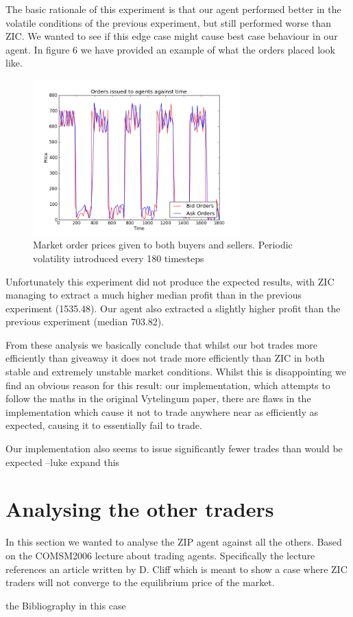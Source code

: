 \documentclass{acm_proc_article-sp}
\begin{document}
The basic rationale of this experiment is that our agent performed better in
the volatile conditions of the previous experiment, but still performed worse
than ZIC. We wanted to see if this edge case might cause best case behaviour in
our agent. In figure 6 we have provided an example of what the orders placed look
like.

\begin{figure}[h!] \includegraphics[width=80mm]{squarewave.png} \caption{Market
order prices given to both buyers and sellers. Periodic volatility introduced
every 180 timesteps} \end{figure}

Unfortunately this experiment did not produce the expected results, with ZIC
managing to extract a much higher median profit than in the previous experiment
(1535.48). Our agent also extracted a slightly higher profit than the previous
experiment (median 703.82).

From these analysis we basically conclude that whilst our bot trades more
efficiently than giveaway it does not trade more efficiently than ZIC in both
stable and extremely unstable market conditions. Whilst this is disappointing
we find an obvious reason for this result: our implementation, which attempts
to follow the maths in the original Vytelingum\cite{Vytellingum:AA} paper,
there are flaws in the implementation which cause it not to trade anywhere near
as efficiently as expected, causing it to essentially fail to trade.

Our implementation also seems to issue significantly fewer trades than would be
expected
--luke expand this

\section{Analysing the other traders}

In this section we wanted to analyse the ZIP agent against all the others.
Based on the COMSM2006\cite{cliff:lecture} lecture about trading agents.
Specifically the lecture references an article written by D. Cliff which is
meant to show a case where ZIC traders will not converge to the equilibrium
price of the market\cite{cliff:minimalint}.

%
the Bibliography in this case
%
%
\appendix 
\end{document}
